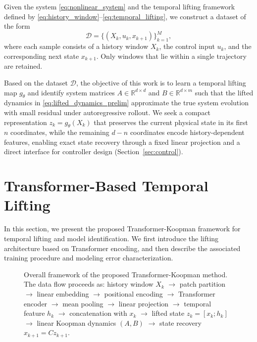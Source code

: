 \documentclass[journal]{IEEEtran}
\begin{document}
Given the system \eqref{eq:nonlinear_system} and the temporal lifting framework defined by \eqref{eq:history_window}--\eqref{eq:temporal_lifting}, we construct a dataset of the form
\begin{equation}
    \mathcal{D} = \{(X_k, u_k, x_{k+1})\}_{k=1}^{M},
    \label{eq:dataset}
\end{equation}
where each sample consists of a history window $X_k$, the control input $u_k$, and the corresponding next state $x_{k+1}$. Only windows that lie within a single trajectory are retained.

Based on the dataset $\mathcal{D}$, the objective of this work is to learn a temporal lifting map $g_\theta$ and identify system matrices $A \in \mathbb{R}^{d\times d}$ and $B \in \mathbb{R}^{d\times m}$ such that the lifted dynamics in \eqref{eq:lifted_dynamics_prelim} approximate the true system evolution with small residual under autoregressive rollout. We seek a compact representation $z_k = g_\theta(X_k)$ that preserves the current physical state in its first $n$ coordinates, while the remaining $d-n$ coordinates encode history-dependent features, enabling exact state recovery through a fixed linear projection and a direct interface for controller design (Section~\ref{sec:control}).

\section{Transformer-Based Temporal Lifting}
\label{sec:methodology}

In this section, we present the proposed Transformer-Koopman framework for temporal lifting and model identification. We first introduce the lifting architecture based on Transformer encoding, and then describe the associated training procedure and modeling error characterization.

\begin{figure}[!t]
    \centering
    \caption{Overall framework of the proposed Transformer-Koopman method. The data flow proceeds as: history window $X_k$ $\rightarrow$ patch partition $\rightarrow$ linear embedding $\rightarrow$ positional encoding $\rightarrow$ Transformer encoder $\rightarrow$ mean pooling $\rightarrow$ linear projection $\rightarrow$ temporal feature $h_k$ $\rightarrow$ concatenation with $x_k$ $\rightarrow$ lifted state $z_k=[x_k;h_k]$ $\rightarrow$ linear Koopman dynamics $(A,B)$ $\rightarrow$ state recovery $x_{k+1}=Cz_{k+1}$.}
    \label{fig:framework}
\end{figure}
\end{document}
